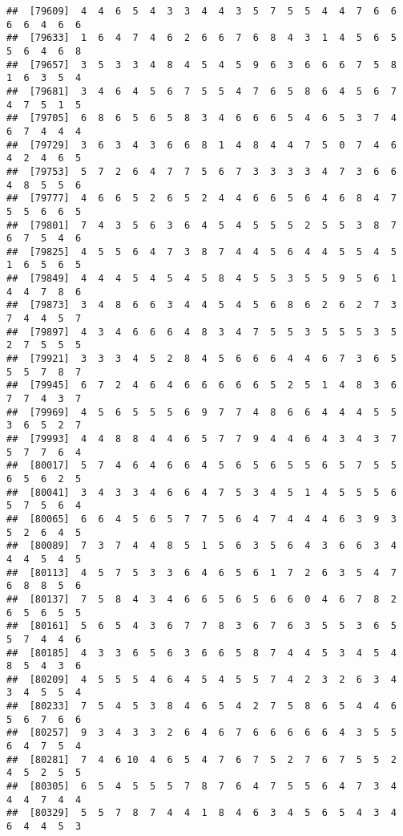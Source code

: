 \documentclass[
]{book}
\begin{document}
\begin{verbatim}
##  [79609]  4  4  6  5  4  3  3  4  4  3  5  7  5  5  4  4  7  6  6  6  6  4  6  6
##  [79633]  1  6  4  7  4  6  2  6  6  7  6  8  4  3  1  4  5  6  5  5  6  4  6  8
##  [79657]  3  5  3  3  4  8  4  5  4  5  9  6  3  6  6  6  7  5  8  1  6  3  5  4
##  [79681]  3  4  6  4  5  6  7  5  5  4  7  6  5  8  6  4  5  6  7  4  7  5  1  5
##  [79705]  6  8  6  5  6  5  8  3  4  6  6  6  5  4  6  5  3  7  4  6  7  4  4  4
##  [79729]  3  6  3  4  3  6  6  8  1  4  8  4  4  7  5  0  7  4  6  4  2  4  6  5
##  [79753]  5  7  2  6  4  7  7  5  6  7  3  3  3  3  4  7  3  6  6  4  8  5  5  6
##  [79777]  4  6  6  5  2  6  5  2  4  4  6  6  5  6  4  6  8  4  7  5  5  6  6  5
##  [79801]  7  4  3  5  6  3  6  4  5  4  5  5  5  2  5  5  3  8  7  6  7  5  4  6
##  [79825]  4  5  5  6  4  7  3  8  7  4  4  5  6  4  4  5  5  4  5  1  6  5  6  5
##  [79849]  4  4  4  5  4  5  4  5  8  4  5  5  3  5  5  9  5  6  1  4  4  7  8  6
##  [79873]  3  4  8  6  6  3  4  4  5  4  5  6  8  6  2  6  2  7  3  7  4  4  5  7
##  [79897]  4  3  4  6  6  6  4  8  3  4  7  5  5  3  5  5  5  3  5  2  7  5  5  5
##  [79921]  3  3  3  4  5  2  8  4  5  6  6  6  4  4  6  7  3  6  5  5  5  7  8  7
##  [79945]  6  7  2  4  6  4  6  6  6  6  6  5  2  5  1  4  8  3  6  7  7  4  3  7
##  [79969]  4  5  6  5  5  5  6  9  7  7  4  8  6  6  4  4  4  5  5  3  6  5  2  7
##  [79993]  4  4  8  8  4  4  6  5  7  7  9  4  4  6  4  3  4  3  7  5  7  7  6  4
##  [80017]  5  7  4  6  4  6  6  4  5  6  5  6  5  5  6  5  7  5  5  6  5  6  2  5
##  [80041]  3  4  3  3  4  6  6  4  7  5  3  4  5  1  4  5  5  5  6  5  7  5  6  4
##  [80065]  6  6  4  5  6  5  7  7  5  6  4  7  4  4  4  6  3  9  3  5  2  6  4  5
##  [80089]  7  3  7  4  4  8  5  1  5  6  3  5  6  4  3  6  6  3  4  4  4  5  4  5
##  [80113]  4  5  7  5  3  3  6  4  6  5  6  1  7  2  6  3  5  4  7  6  8  8  5  6
##  [80137]  7  5  8  4  3  4  6  6  5  6  5  6  6  0  4  6  7  8  2  6  5  6  5  5
##  [80161]  5  6  5  4  3  6  7  7  8  3  6  7  6  3  5  5  3  6  5  5  7  4  4  6
##  [80185]  4  3  3  6  5  6  3  6  6  5  8  7  4  4  5  3  4  5  4  8  5  4  3  6
##  [80209]  4  5  5  5  4  6  4  5  4  5  5  7  4  2  3  2  6  3  4  3  4  5  5  4
##  [80233]  7  5  4  5  3  8  4  6  5  4  2  7  5  8  6  5  4  4  6  5  6  7  6  6
##  [80257]  9  3  4  3  3  2  6  4  6  7  6  6  6  6  6  4  3  5  5  6  4  7  5  4
##  [80281]  7  4  6 10  4  6  5  4  7  6  7  5  2  7  6  7  5  5  2  4  5  2  5  5
##  [80305]  6  5  4  5  5  5  7  8  7  6  4  7  5  5  6  4  7  3  4  4  4  7  4  4
##  [80329]  5  5  7  8  7  4  4  1  8  4  6  3  4  5  6  5  4  3  4  6  4  4  5  3

\end{verbatim}
\end{document}
